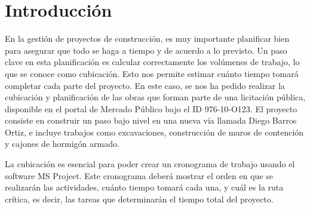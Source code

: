 \documentclass{article} %
\begin{document}
\newpage
\tableofcontents
\thispagestyle{plain} %
\thispagestyle{empty} %
\newpage

\setcounter{page}{1} %
\section{Introducción}

En la gestión de proyectos de construcción, es muy importante planificar bien para asegurar que todo se haga a tiempo y de acuerdo a lo previsto. Un paso clave en esta planificación es calcular correctamente los volúmenes de trabajo, lo que se conoce como cubicación. Esto nos permite estimar cuánto tiempo tomará completar cada parte del proyecto. En este caso, se nos ha pedido realizar la cubicación y planificación de las obras que forman parte de una licitación pública, disponible en el portal de Mercado Público bajo el ID 976-10-O123. El proyecto consiste en construir un paso bajo nivel en una nueva vía llamada Diego Barros Ortiz, e incluye trabajos como excavaciones, construcción de muros de contención y cajones de hormigón armado.

La cubicación es esencial para poder crear un cronograma de trabajo usando el software MS Project. Este cronograma deberá mostrar el orden en que se realizarán las actividades, cuánto tiempo tomará cada una, y cuál es la ruta crítica, es decir, las tareas que determinarán el tiempo total del proyecto.
\end{document}

